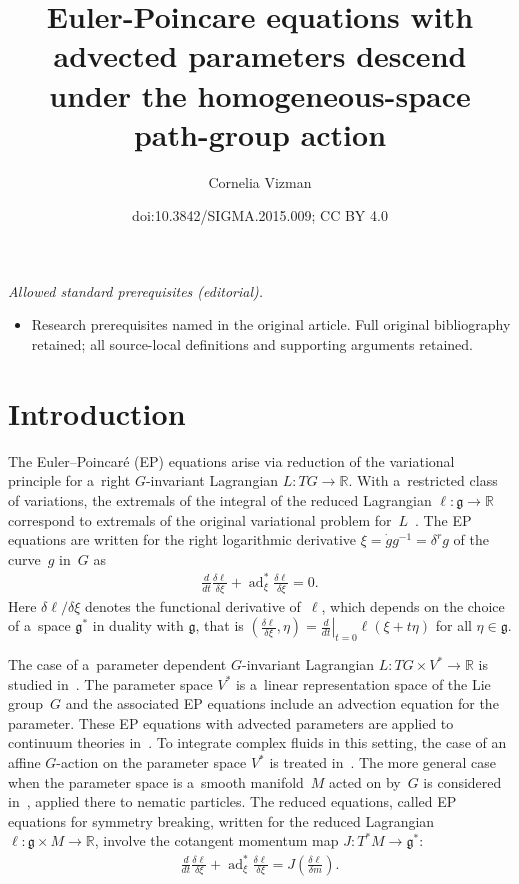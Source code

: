 \documentclass[10pt,a4paper]{amsart}
\title{Euler-Poincare equations with advected parameters descend under the homogeneous-space path-group action}
\author{Cornelia Vizman}
\date{doi:10.3842/SIGMA.2015.009; CC BY 4.0}
\numberwithin{equation}{section}
\begin{document}
\maketitle
\noindent\textit{Allowed standard prerequisites (editorial).}\begin{itemize}
\item Research prerequisites named in the original article. Full original bibliography retained; all source-local definitions and supporting arguments retained.
\end{itemize}\medskip
\section{Introduction}

The Euler--Poincar\'e (EP) equations arise via reduction of the variational principle for a~right $G$-invariant
Lagrangian $L:TG\to\mathbb R$.
With a~restricted class of variations, the extremals of the integral of the reduced Lagrangian $\ell:\mathfrak
g\to\mathbb R$ correspond to extremals of the original variational problem for~$L$~\cite{MR}.
The EP equations are written for the right logarithmic derivative $\xi=\dot g g^{-1}=\delta^rg$ of the curve~$g$ in~$G$
as
\begin{gather}
\label{epintro}
\frac{d}{dt}\frac{\delta\ell}{\delta \xi}+\operatorname{ad}^*_\xi\frac{\delta\ell}{\delta\xi}=0.
\end{gather}
Here $\delta \ell/\delta\xi$ denotes the functional derivative of~$\ell$, which depends on the choice of a~space
$\mathfrak{g}^*$ in duality with $\mathfrak{g}$, that is $(\frac{\delta
\ell}{\delta\xi},\eta)=\left.\frac{d}{dt}\right|_{t=0}\ell(\xi+t\eta)$ for all $\eta\in\mathfrak{g}$.

The case of a~parameter dependent $G$-invariant Lagrangian $L:TG\times V^*\to\mathbb R$ is studied in~\cite{CHMR}.
The parameter space $V^*$ is a~linear representation space of the Lie group~$G$ and the associated EP equations include
an advection equation for the parameter.
These EP equations with advected parameters are applied to continuum theories in~\cite{HMR}.
To integrate complex f\/luids in this setting, the case of an af\/f\/ine $G$-action on the parameter space $V^*$ is treated
in~\cite{GBR}.
The more general case when the parameter space is a~smooth manifold~$M$ acted on by~$G$ is considered in~\cite{GBT},
applied there to nematic particles.
The reduced equations, called EP equations for symmetry breaking, written for the reduced Lagrangian $\ell:\mathfrak
g\times M\to\mathbb R$, involve the cotangent momentum map $J:T^*M\to\mathfrak g^*$:
\begin{gather*}
\frac{d}{dt}\frac{\delta\ell}{\delta\xi}+\operatorname{ad}^*_\xi\frac{\delta
\ell}{\delta\xi}=J\left(\frac{\delta\ell}{\delta m}\right).
\end{gather*}
\end{document}

